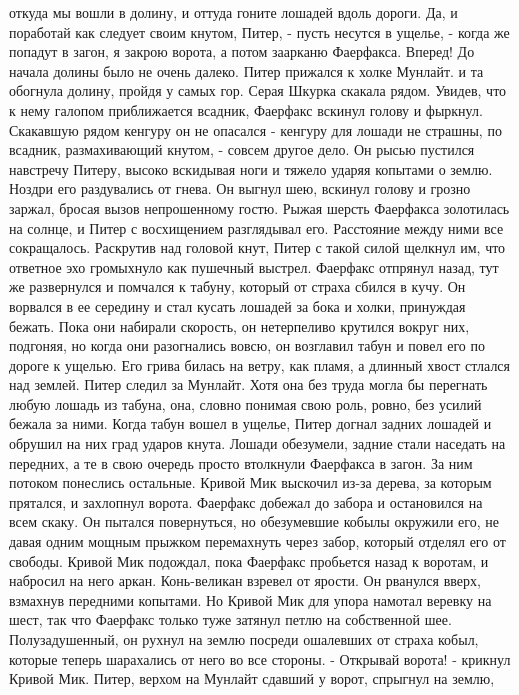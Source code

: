 откуда мы вошли в долину, и оттуда гоните лошадей вдоль дороги. Да, и 
поработай как следует своим кнутом, Питер, - пусть несутся в ущелье, - 
когда же попадут в загон, я закрою ворота, а потом заарканю Фаерфакса. 
Вперед!
    До начала долины было не очень далеко. Питер прижался к холке 
Мунлайт. и та обогнула долину, пройдя у самых гор. Серая Шкурка 
скакала рядом.
    Увидев, что к нему галопом приближается всадник, Фаерфакс вскинул 
голову и фыркнул. Скакавшую рядом кенгуру он не опасался - кенгуру для 
лошади не страшны, по всадник, размахивающий кнутом, - совсем другое 
дело.
    Он рысью пустился навстречу Питеру, высоко вскидывая ноги и тяжело 
ударяя копытами о землю. Ноздри его раздувались от гнева. Он выгнул 
шею, вскинул голову и грозно заржал, бросая вызов непрошенному гостю. 
Рыжая шерсть Фаерфакса золотилась на солнце, и Питер с восхищением 
разглядывал его. Расстояние между ними все сокращалось.
    Раскрутив над головой кнут, Питер с такой силой щелкнул им, что 
ответное эхо громыхнуло как пушечный выстрел. Фаерфакс отпрянул назад, 
тут же развернулся и помчался к табуну, который от страха сбился в 
кучу. Он ворвался в ее середину и стал кусать лошадей за бока и холки, 
принуждая бежать. Пока они набирали скорость, он нетерпеливо крутился 
вокруг них, подгоняя, но когда они разогнались вовсю, он возглавил 
табун и повел его по дороге к ущелью. Его грива билась на ветру, как 
пламя, а длинный хвост стлался над землей.
    Питер следил за Мунлайт. Хотя она без труда могла бы перегнать 
любую лошадь из табуна, она, словно понимая свою роль, ровно, без 
усилий бежала за ними.
    Когда табун вошел в ущелье, Питер догнал задних лошадей и обрушил 
на них град ударов кнута. Лошади обезумели, задние стали наседать на 
передних, а те в свою очередь просто втолкнули Фаерфакса в загон. За 
ним потоком понеслись остальные. Кривой Мик выскочил из-за дерева, за 
которым прятался, и захлопнул ворота.
    Фаерфакс добежал до забора и остановился на всем скаку. Он пытался 
повернуться, но обезумевшие кобылы окружили его, не давая одним мощным 
прыжком перемахнуть через забор, который отделял его от свободы.
    Кривой Мик подождал, пока Фаерфакс пробьется назад к воротам, и 
набросил на него аркан. Конь-великан взревел от ярости. Он рванулся 
вверх, взмахнув передними копытами. Но Кривой Мик для упора намотал 
веревку на шест, так что Фаерфакс только туже затянул петлю на 
собственной шее. Полузадушенный, он рухнул на землю посреди ошалевших 
от страха кобыл, которые теперь шарахались от него во все стороны.
    - Открывай ворота! - крикнул Кривой Мик.
    Питер, верхом на Мунлайт сдавший у ворот, спрыгнул на землю, 
